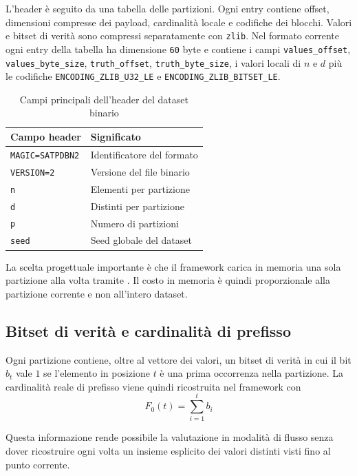 L'header è seguito da una tabella delle partizioni. Ogni entry contiene offset,
dimensioni compresse dei payload, cardinalità locale e codifiche dei blocchi.
Valori e bitset di verità sono compressi separatamente con \texttt{zlib}.
Nel formato corrente ogni entry della tabella ha dimensione \texttt{60} byte e
contiene i campi \texttt{values\_offset}, \texttt{values\_byte\_size},
\texttt{truth\_offset}, \texttt{truth\_byte\_size}, i valori locali di \(n\) e
\(d\) più le codifiche \texttt{ENCODING\_ZLIB\_U32\_LE} e
\texttt{ENCODING\_ZLIB\_BITSET\_LE}.

\begin{table}[htbp]
    \centering
    \small
    \begin{tabular}{|l|l|}
        \hline
        Campo header & Significato \\
        \hline
        \texttt{MAGIC=SATPDBN2} & Identificatore del formato \\
        \texttt{VERSION=2} & Versione del file binario \\
        \texttt{n} & Elementi per partizione \\
        \texttt{d} & Distinti per partizione \\
        \texttt{p} & Numero di partizioni \\
        \texttt{seed} & Seed globale del dataset \\
        \hline
    \end{tabular}
    \caption{Campi principali dell'header del dataset binario}
    \label{tab:binary-header}
\end{table}

La scelta progettuale importante è che il framework carica in memoria una sola
partizione alla volta tramite . Il
costo in memoria è quindi proporzionale alla partizione corrente e non
all'intero dataset.

\subsection{Bitset di verità e cardinalità di prefisso}

Ogni partizione contiene, oltre al vettore dei valori, un bitset di verità in
cui il bit \(b_t\) vale \(1\) se l'elemento in posizione \(t\) è una prima
occorrenza nella partizione. La cardinalità reale di prefisso viene quindi
ricostruita nel framework con
\[
F_0(t)=\sum_{i=1}^{t} b_i
\]

Questa informazione rende possibile la valutazione in modalità di flusso senza
dover ricostruire ogni volta un insieme esplicito dei valori distinti visti fino al
punto corrente.

